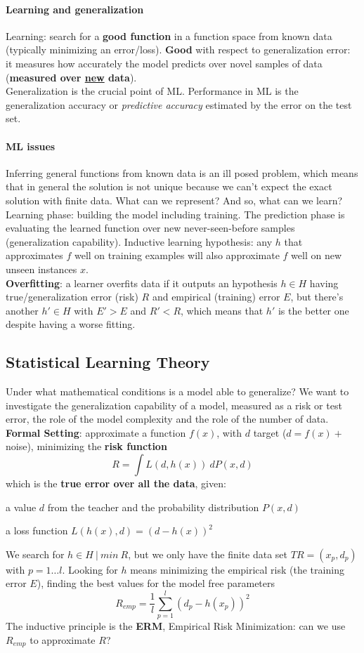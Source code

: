 \documentclass[10pt]{report}
\begin{document}
\paragraph{Learning and generalization} Learning: search for a \textbf{good function} in a function space from known data (typically minimizing an error/loss). \textbf{Good} with respect to generalization error: it measures how accurately the model predicts over novel samples of data (\textbf{measured over \underline{new} data}).\\
Generalization is the crucial point of ML. Performance in ML is the generalization accuracy or \textit{predictive accuracy} estimated by the error on the test set.
\paragraph{ML issues} Inferring general functions from known data is an ill posed problem, which means that in general the solution is not unique because we can't expect the exact solution with finite data. What can we represent? And so, what can we learn?\\
Learning phase: building the model including training. The prediction phase is evaluating the learned function over new never-seen-before samples (generalization capability). Inductive learning hypothesis: any $h$ that approximates $f$ well on training examples will also approximate $f$ well on new unseen instances $x$.\\
\textbf{Overfitting}: a learner overfits data if it outputs an hypothesis $h\in H$ having true/generalization error (risk) $R$ and empirical (training) error $E$, but there's another $h'\in H$ with $E' > E$ and $R' < R$, which means that $h'$ is the better one despite having a worse fitting.
\subsection{Statistical Learning Theory} Under what mathematical conditions is a model able to generalize? We want to investigate the generalization capability of a model, measured as a risk or test error, the role of the model complexity and the role of the number of data.\\
\textbf{Formal Setting}: approximate a function $f(x)$, with $d$ target ($d = f(x) +$ noise), minimizing the \textbf{risk function} $$R = \int L(d, h(x))\:dP(x,d)$$ which is the \textbf{true error over all the data}, given:
\begin{list}{}{}
	\item a value $d$ from the teacher and the probability distribution $P(x,d)$
	\item a loss function $L(h(x),d) = (d - h(x))^2$
\end{list}
We search for $h\in H\:|\: min\:R$, but we only have the finite data set $TR = (x_p, d_p)$ with $p = 1\ldots l$. Looking for $h$ means minimizing the empirical risk (the training error $E$), finding the best values for the model free parameters $$R_{emp} = \frac{1}{l}\sum_{p=1}^l (d_p - h(x_p))^2$$
The inductive principle is the \textbf{ERM}, Empirical Risk Minimization: can we use $R_{emp}$ to approximate $R$?
\end{document}

